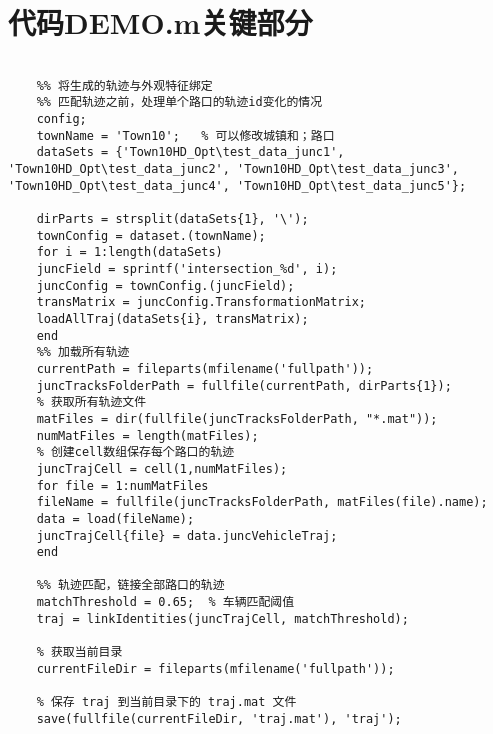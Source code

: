 \section{代码DEMO.m关键部分}


\begin{lstlisting}
	
	%% 将生成的轨迹与外观特征绑定
	%% 匹配轨迹之前，处理单个路口的轨迹id变化的情况
	config;
	townName = 'Town10';   % 可以修改城镇和；路口
	dataSets = {'Town10HD_Opt\test_data_junc1', 'Town10HD_Opt\test_data_junc2', 'Town10HD_Opt\test_data_junc3', 'Town10HD_Opt\test_data_junc4', 'Town10HD_Opt\test_data_junc5'};
	
	dirParts = strsplit(dataSets{1}, '\');
	townConfig = dataset.(townName);
	for i = 1:length(dataSets)
	juncField = sprintf('intersection_%d', i);
	juncConfig = townConfig.(juncField);
	transMatrix = juncConfig.TransformationMatrix;
	loadAllTraj(dataSets{i}, transMatrix);
	end
	%% 加载所有轨迹
	currentPath = fileparts(mfilename('fullpath'));
	juncTracksFolderPath = fullfile(currentPath, dirParts{1});
	% 获取所有轨迹文件
	matFiles = dir(fullfile(juncTracksFolderPath, "*.mat"));
	numMatFiles = length(matFiles);
	% 创建cell数组保存每个路口的轨迹
	juncTrajCell = cell(1,numMatFiles);
	for file = 1:numMatFiles
	fileName = fullfile(juncTracksFolderPath, matFiles(file).name);
	data = load(fileName);
	juncTrajCell{file} = data.juncVehicleTraj;
	end
	
	%% 轨迹匹配，链接全部路口的轨迹
	matchThreshold = 0.65;  % 车辆匹配阈值
	traj = linkIdentities(juncTrajCell, matchThreshold);
	
	% 获取当前目录
	currentFileDir = fileparts(mfilename('fullpath')); 
	
	% 保存 traj 到当前目录下的 traj.mat 文件
	save(fullfile(currentFileDir, 'traj.mat'), 'traj');
	
	
\end{lstlisting}

